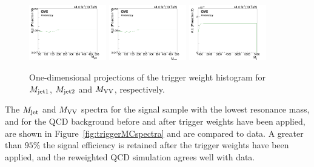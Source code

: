 \begin{figure}[h!]
\centering
\includegraphics[width=0.3\textwidth]{figures/analysis/search3/AN-17-303/trigger/3D_x.png}
\includegraphics[width=0.3\textwidth]{figures/analysis/search3/AN-17-303/trigger/3D_y.png}
\includegraphics[width=0.3\textwidth]{figures/analysis/search3/AN-17-303/trigger/3D_z.png}
\caption{One-dimensional projections of the trigger weight histogram for $M_{\rm jet1}$, $M_{\rm jet2}$ and $M_{\rm VV}$, respectively.}
\label{fig:triggerProj}
\end{figure}
The $M_{\rm jet}$ and $M_{\rm VV}$ spectra for the signal sample with the lowest resonance mass, and for the QCD background before and after trigger weights have been applied, are shown in Figure~\ref{fig:triggerMCspectra} and are compared to data. A greater than $95\%$ the signal efficiency is retained after the trigger weights have been applied, and the reweighted QCD simulation agrees well with data.
